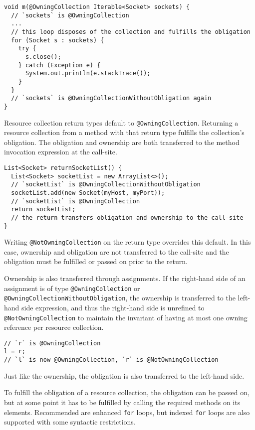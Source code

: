 \begin{Verbatim}
void m(@OwningCollection Iterable<Socket> sockets) {
  // `sockets` is @OwningCollection
  ...
  // this loop disposes of the collection and fulfills the obligation
  for (Socket s : sockets) {
    try {
      s.close();
    } catch (Exception e) {
      System.out.println(e.stackTrace());
    }
  }
  // `sockets` is @OwningCollectionWithoutObligation again
}
\end{Verbatim}

Resource collection return types default to \texttt{@OwningCollection}. Returning a resource collection from a method with that return type fulfills the collection's obligation. The obligation and ownership are both transferred to the method invocation expression at the call-site.

\begin{verbatim}
List<Socket> returnSocketList() {
  List<Socket> socketList = new ArrayList<>();
  // `socketList` is @OwningCollectionWithoutObligation
  socketList.add(new Socket(myHost, myPort));
  // `socketList` is @OwningCollection
  return socketList;
  // the return transfers obligation and ownership to the call-site
}
\end{verbatim}

Writing \texttt{@NotOwningCollection} on the return type overrides this default. In this case, ownership and obligation are not transferred to the call-site and the obligation must be fulfilled or passed on prior to the return.

Ownership is also transferred through assignments. If the right-hand side of an assignment is of type \texttt{@OwningCollection} or \texttt{@OwningCollectionWithoutObligation}, the ownership is transferred to the left-hand side expression, and thus the right-hand side is unrefined to \texttt{@NotOwningCollection} to maintain the invariant of having at most one owning reference per resource collection.

\begin{verbatim}
// `r` is @OwningCollection
l = r;
// `l` is now @OwningCollection, `r` is @NotOwningCollection
\end{verbatim}

Just like the ownership, the obligation is also transferred to the left-hand side.


To fulfill the obligation of a resource collection, the obligation can be passed on, but at some point it has to be fulfilled by calling the required methods on its elements. Recommended are enhanced \texttt{for} loops, but indexed \texttt{for} loops are also supported with some syntactic restrictions.

